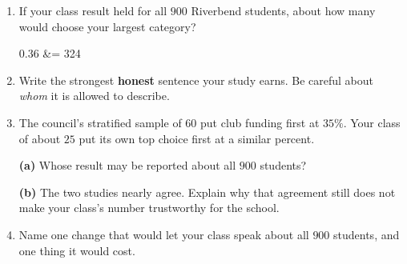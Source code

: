 \documentclass[10pt]{article}
\begin{document}
\vspace{0.03in}

\boxguard
\begin{tcolorbox}[colback=white, colframe=black!40, breakable,
    title=\textbf{Tier E --- Extension: Report It, Then Judge It},
    fonttitle=\bfseries, arc=2mm, left=3mm, right=3mm, top=1.5mm, bottom=1.5mm]
\small
\begin{enumerate}[leftmargin=1.6em, itemsep=4pt, topsep=3pt]

  \item If your class result held for all $900$ Riverbend students, about how
        many would choose your largest category?

        \begin{work}
          0.36  &= 324 
        \end{work}

  \item Write the strongest \textbf{honest} sentence your study earns. Be
        careful about \emph{whom} it is allowed to describe.

  \item The council's stratified sample of $60$ put club funding first at
        $35\%$. Your class of about $25$ put its own top choice first at a
        similar percent.

        \textbf{(a)} Whose result may be reported about all $900$ students?
        \blank{4.4cm}

        \textbf{(b)} The two studies nearly agree. Explain why that agreement
        still does not make your class's number trustworthy for the school.

  \item Name one change that would let your class speak about all $900$
        students, and one thing it would cost. \writeline

\end{enumerate}
\end{tcolorbox}
\end{document}
